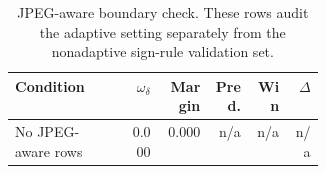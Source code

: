 \begin{table}[t]
\caption{JPEG-aware boundary check. These rows audit the adaptive setting separately from the nonadaptive sign-rule validation set.}
\label{tab:jpeg-aware}
\centering
\tiny
{\setlength{\tabcolsep}{1.5pt}
\begin{tabular}{@{}p{0.36\linewidth}rrrrr@{}}
\hline
Condition & \(\omega_\delta\) & Margin & Pred. & Win & \(\Delta\) \\
\hline
No JPEG-aware rows & 0.000 & 0.000 & n/a & n/a & n/a \\
\hline
\end{tabular}
}
\end{table}
